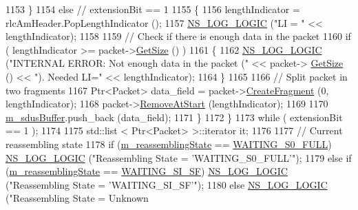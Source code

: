 \begin{DoxyCode}
1153         \}
1154       \textcolor{keywordflow}{else} \textcolor{comment}{// extensionBit == 1}
1155         \{
1156           lengthIndicator = rlcAmHeader.PopLengthIndicator ();
1157           \hyperlink{group__logging_ga88acd260151caf2db9c0fc84997f45ce}{NS\_LOG\_LOGIC} (\textcolor{stringliteral}{"LI = "} << lengthIndicator);
1158 
1159           \textcolor{comment}{// Check if there is enough data in the packet}
1160           \textcolor{keywordflow}{if} ( lengthIndicator >= packet->\hyperlink{classns3_1_1Packet_a462855c9929954d4301a4edfe55f4f1c}{GetSize} () )
1161             \{
1162               \hyperlink{group__logging_ga88acd260151caf2db9c0fc84997f45ce}{NS\_LOG\_LOGIC} (\textcolor{stringliteral}{"INTERNAL ERROR: Not enough data in the packet ("} << packet->
      \hyperlink{classns3_1_1Packet_a462855c9929954d4301a4edfe55f4f1c}{GetSize} () << \textcolor{stringliteral}{"). Needed LI="} << lengthIndicator);
1164             \}
1165 
1166           \textcolor{comment}{// Split packet in two fragments}
1167           Ptr<Packet> data\_field = packet->\hyperlink{classns3_1_1Packet_a16f6113606b355b2b346e2245fa2a3d0}{CreateFragment} (0, lengthIndicator);
1168           packet->\hyperlink{classns3_1_1Packet_a78aa207e7921dd2f9f7e0d0b7a1c730a}{RemoveAtStart} (lengthIndicator);
1169 
1170           \hyperlink{classns3_1_1LteRlcAm_abd47ae50bcc975615b87dd53d86efd8e}{m\_sdusBuffer}.push\_back (data\_field);
1171         \}
1172     \}
1173   \textcolor{keywordflow}{while} ( extensionBit == 1 );
1174 
1175   std::list < Ptr<Packet> >::iterator it;
1176 
1177   \textcolor{comment}{// Current reassembling state}
1178   \textcolor{keywordflow}{if}      (\hyperlink{classns3_1_1LteRlcAm_a0a7982a045b0eb6233be74a419f8249c}{m\_reassemblingState} == \hyperlink{classns3_1_1LteRlcAm_a43eeebdccf778e2247c956481ed03d62a832e01ad620b816d8bc1fe1b3fea8708}{WAITING\_S0\_FULL})  
      \hyperlink{group__logging_ga88acd260151caf2db9c0fc84997f45ce}{NS\_LOG\_LOGIC} (\textcolor{stringliteral}{"Reassembling State = 'WAITING\_S0\_FULL'"});
1179   \textcolor{keywordflow}{else} \textcolor{keywordflow}{if} (\hyperlink{classns3_1_1LteRlcAm_a0a7982a045b0eb6233be74a419f8249c}{m\_reassemblingState} == \hyperlink{classns3_1_1LteRlcAm_a43eeebdccf778e2247c956481ed03d62a967f9c81a213f824b6a908bdfc1a7e4e}{WAITING\_SI\_SF})    
      \hyperlink{group__logging_ga88acd260151caf2db9c0fc84997f45ce}{NS\_LOG\_LOGIC} (\textcolor{stringliteral}{"Reassembling State = 'WAITING\_SI\_SF'"});
1180   \textcolor{keywordflow}{else}                                              \hyperlink{group__logging_ga88acd260151caf2db9c0fc84997f45ce}{NS\_LOG\_LOGIC} (\textcolor{stringliteral}{"Reassembling State = Unknown
}
\end{DoxyCode}
